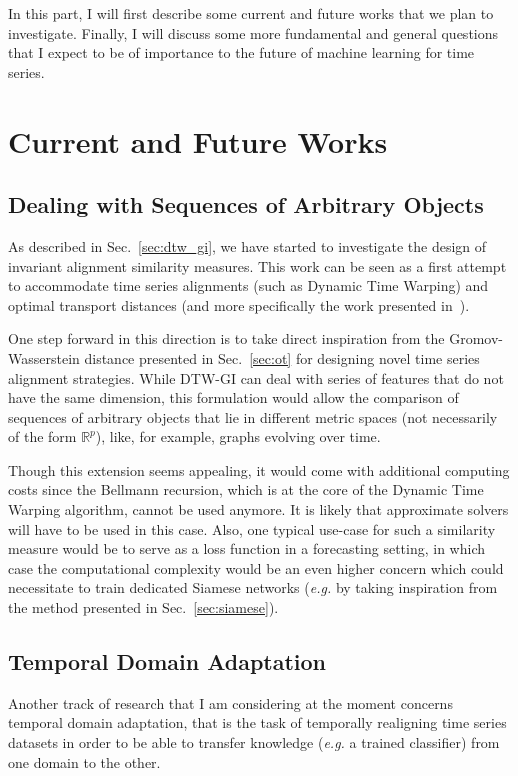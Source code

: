 In this part, I will first describe some current and future works that we plan
to investigate.
Finally, I will discuss some more fundamental and general questions that
I expect to be of importance to the future of machine learning for time series.

\section{Current and Future Works}

\subsection{Dealing with Sequences of Arbitrary Objects}

As described in Sec.~\ref{sec:dtw_gi}, we have started to investigate
the design of invariant alignment similarity measures.
This work can be seen as a first attempt to accommodate time series alignments
(such as Dynamic Time Warping) and optimal transport distances
(and more specifically the work presented in~\cite{alvarez2018towards}).

One step forward in this direction is to take direct inspiration from
the Gromov-Wasserstein distance presented in Sec.~\ref{sec:ot} for designing
novel time series alignment strategies.
While DTW-GI can deal with series of features that do not have the
same dimension, this formulation would allow the comparison of
sequences of arbitrary objects that lie in different metric spaces (not
necessarily of the form $\mathbb{R}^p$), like, for example, graphs evolving
over time.

Though this extension seems appealing, it would come with additional
computing costs since the Bellmann recursion, which is at the core of the
Dynamic
Time Warping algorithm, cannot be used anymore.
It is likely that approximate solvers will have to be used in this case.
Also, one typical use-case for such a similarity measure would be to serve as
a loss function in a forecasting setting, in which case the
computational complexity would be an even higher concern which could necessitate
to train dedicated Siamese networks (\emph{e.g.} by taking inspiration from the
method presented in
Sec.~\ref{sec:siamese}).

\subsection{Temporal Domain Adaptation}

Another track of research that I am considering at the moment concerns
temporal domain adaptation, that is the task of temporally realigning time
series datasets in order to be able to transfer knowledge (\emph{e.g.} a trained
classifier) from one domain to the other.


